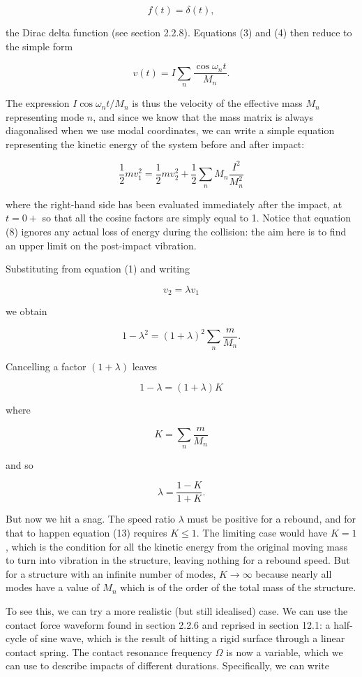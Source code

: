   $$f(t) = \delta(t), \tag{6}$$ 

  the Dirac delta function (see section 2.2.8). Equations (3) and (4) then 
  reduce to the simple form 

  $$v(t) = I \sum_n{\dfrac{\cos \omega_n t}{M_n}} . \tag{7}$$ 

  The expression $I \cos \omega_n t /M_n$ is thus the velocity of the effective 
  mass $M_n$ representing mode $n$, and since we know that the mass matrix is 
  always diagonalised when we use modal coordinates, we can write a simple 
  equation representing the kinetic energy of the system before and after 
  impact: 

  $$\frac{1}{2}m v_1^2 = \frac{1}{2}m v_2^2 +\frac{1}{2} \sum_n{M_n 
  \dfrac{I^2}{M_n^2}} \tag{8}$$ 

  where the right-hand side has been evaluated immediately after the impact, at 
  $t=0+$ so that all the cosine factors are simply equal to 1. Notice that 
  equation (8) ignores any actual loss of energy during the collision: the aim 
  here is to find an upper limit on the post-impact vibration. 

  Substituting from equation (1) and writing 

  $$v_2= \lambda v_1 \tag{9}$$ 

  we obtain 

  $$1- \lambda^2 = (1+\lambda)^2 \sum_n{\dfrac{m}{M_n}} . \tag{10}$$ 

  Cancelling a factor $(1+ \lambda)$ leaves 

  $$1-\lambda = (1+\lambda)K \tag{11}$$ 

  where 

  $$K=\sum_n{\dfrac{m}{M_n}} \tag{12}$$ 

  and so 

  $$\lambda = \dfrac{1-K}{1+K}. \tag{13}$$ 

  But now we hit a snag. The speed ratio $\lambda$ must be positive for a 
  rebound, and for that to happen equation (13) requires $K \le 1$. The 
  limiting case would have $K=1$, which is the condition for all the kinetic 
  energy from the original moving mass to turn into vibration in the structure, 
  leaving nothing for a rebound speed. But for a structure with an infinite 
  number of modes, $K \rightarrow \infty$ because nearly all modes have a value 
  of $M_n$ which is of the order of the total mass of the structure. 

  To see this, we can try a more realistic (but still idealised) case. We can 
  use the contact force waveform found in section 2.2.6 and reprised in section 
  12.1: a half-cycle of sine wave, which is the result of hitting a rigid 
  surface through a linear contact spring. The contact resonance frequency 
  $\Omega$ is now a variable, which we can use to describe impacts of different 
  durations. Specifically, we can write 

